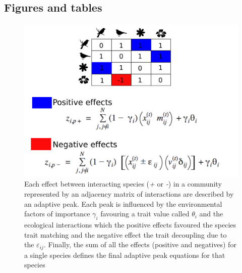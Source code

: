 \documentclass[a4paper, 12pt]{article}
\begin{document}
\subsection*{Figures and tables}
\begin{singlespace}
\begin{figure}[H]
  \centering
  \includegraphics[width=\linewidth]{Sup_Figura_1.pdf}
  \vspace*{-7mm}
  \caption{Each effect between interacting species (\textit{+} or \textit{-}) in a community represented by an adjacency matrix of interactions are described by an adaptive peak. Each peak is influenced by the environmental factors of importance $\gamma_{i}$ favouring a trait value called $\theta{_i}$ and the ecological interactions which the positive effects favoured the species trait matching and the negative effect the trait decoupling due to the $\varepsilon_{ij}$. Finally, the sum of all the effects (positive and negatives) for a single species defines the final adaptive peak equations for that species}
  \label{supfig:1}
\end{figure}


\end{singlespace}
\end{document}
